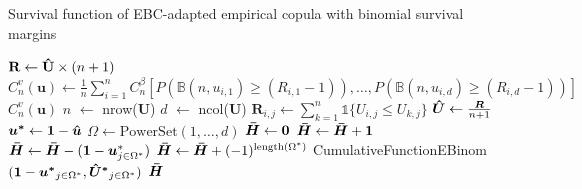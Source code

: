 \documentclass[12pt]{report}
\newcommand{\1}{\mathbf{1}}
\begin{document}
\begin{flushleft}
\begin{algorithm}[H]
\caption{Survival function of EBC-adapted empirical copula with binomial survival margins}
\begin{algorithmic}
 
    \State $\textbf{R} \gets \mathbf{\Hat{U}} \times (n + 1)$
    \State $C^{v}_{n}(\textbf{u}) \gets \frac{1}{n}\sum\limits_{i = 1}^{n} C_{n}^{\beta} \left[P\left(\mathbb{B}(n, u_{i,1}) \ge (R_{i,1} - 1)\right), \dots, P\left(\mathbb{B}(n, u_{i,d}) \ge (R_{i,d} - 1)\right)\right]$
    \State \Return $C^{v}_{n}(\textbf{u})$
\EndProcedure
{}
    \State $n$ $\gets$ nrow($\boldsymbol{U}$)
    \State $d$ $\gets$ ncol($\boldsymbol{U}$)
            \State $\boldsymbol{R}_{i,j} \gets \sum\limits_{k = 1}^{n} \mathds{1} \{ U_{i,j} \le U_{k,j} \}$
        \EndFor
    \EndFor
    \State $\boldsymbol{\Hat{U}} \gets \frac{\boldsymbol{R}}{n + 1}$ 
    \State $\boldsymbol{u^{*}} \gets \boldsymbol{1} - \boldsymbol{\Hat{u}}$ 
    \State $\Omega \gets \mathrm{PowerSet}(1, \dots, d)$ 
    \State $\boldsymbol{\Bar{H}} \gets \boldsymbol{0}$ 
            \State $\boldsymbol{\Bar{H}} \gets \boldsymbol{\Bar{H}} + \boldsymbol{1}$
            \State $\boldsymbol{\Bar{H}} \gets \boldsymbol{\Bar{H}} - (\boldsymbol{1} - \boldsymbol{u}^{*}_{j \in \Omega^{*}})$ 
        \Else
            \State $\boldsymbol{\Bar{H}} \gets \boldsymbol{\Bar{H}} + (-1)^{\mathrm{length}(\Omega^{*})}$ CumulativeFunctionEBinom$(\boldsymbol{1} - \boldsymbol{u^{*}}_{j \in \Omega^{*}}, \boldsymbol{\Hat{U}^{*}}_{j \in \Omega^{*}}) $
        \EndIf
    \EndFor
    \State \Return $\boldsymbol{\Bar{H}}$
\EndProcedure
\end{algorithmic}
\end{algorithm}


\end{flushleft}
\end{document}
